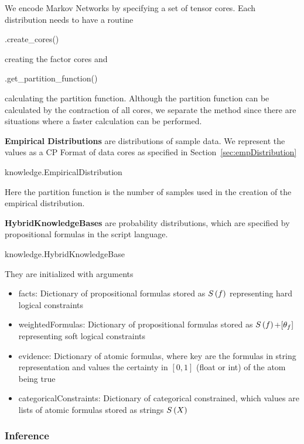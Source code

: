 We encode Markov Networks by specifying a set of tensor cores.
Each distribution needs to have a routine
\begin{centeredcode}
	.create\_cores()
\end{centeredcode}
creating the factor cores and 
\begin{centeredcode}
	.get\_partition\_function()
\end{centeredcode}
calculating the partition function.
Although the partition function can be calculated by the contraction of all cores, we separate the method since there are situations where a faster calculation can be performed.


\textbf{Empirical Distributions} are distributions of sample data.
We represent the values as a CP Format of data cores as specified in Section~\ref{sec:empDistribution}
\begin{centeredcode}
	knowledge.EmpiricalDistribution
\end{centeredcode}
Here the partition function is the number of samples used in the creation of the empirical distribution.


\textbf{HybridKnowledgeBases} are probability distributions, which are specified by propositional formulas in the script language.
\begin{centeredcode}
	knowledge.HybridKnowledgeBase
\end{centeredcode}
They are initialized with arguments
\begin{itemize}
	\item facts: Dictionary of propositional formulas stored as $S\left(f\right)$ representing hard logical constraints
	\item weightedFormulas: Dictionary of propositional formulas stored as $S\left(f\right)$+$[\theta_{f}]$ representing soft logical constraints
	\item evidence: Dictionary of atomic formulas, where key are the formulas in string representation and values the certainty in $[0,1]$ (float or int) of the atom being true
	\item categoricalConstraints: Dictionary of categorical constrained, which values are lists of atomic formulas stored as strings $S\left(X\right)$
\end{itemize}


\subsubsection{Inference}

